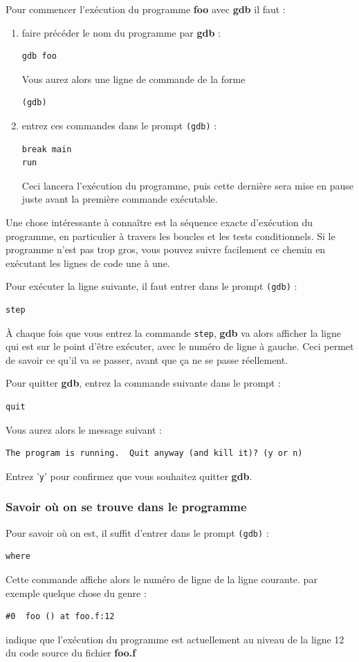 \documentclass[a4paper,twoside]{article}
\begin{document}
Pour commencer l'exécution du programme \textbf{foo} avec \textbf{gdb} il faut : 
\begin{enumerate}
\item faire précéder le nom du programme par \textbf{gdb} : 
\begin{verbatim}
gdb foo
\end{verbatim}
Vous aurez alors une ligne de commande de la forme 
\begin{verbatim}
(gdb) 
\end{verbatim}
\item entrez ces commandes dans le prompt \texttt{(gdb)} :
\begin{verbatim}
break main
run
\end{verbatim}
Ceci lancera l'exécution du programme, puis cette dernière sera mise en pause juste avant la première commande exécutable.
\end{enumerate}

\bigskip

Une chose intéressante à connaître est la séquence exacte d'exécution du programme, en particulier à travers les boucles et les tests conditionnels. Si le programme n'est pas trop gros, vous pouvez suivre facilement ce chemin en exécutant les lignes de code une à une. 

Pour exécuter la ligne suivante, il faut entrer dans le prompt \texttt{(gdb)} :
\begin{verbatim}
step
\end{verbatim}

À chaque fois que vous entrez la commande \texttt{step}, \textbf{gdb} va alors afficher la ligne qui est sur le point d'être exécuter, avec le numéro de ligne à gauche. Ceci permet de savoir ce qu'il va se passer, avant que ça ne se passe réellement.

\bigskip

Pour quitter \textbf{gdb}, entrez la commande suivante dans le prompt : 
\begin{verbatim}
quit
\end{verbatim}
Vous aurez alors le message suivant : 
\begin{verbatim}
The program is running.  Quit anyway (and kill it)? (y or n)
\end{verbatim}
Entrez '\texttt{y}' pour confirmez que vous souhaitez quitter \textbf{gdb}.

\subsubsection{Savoir où on se trouve dans le programme}
Pour savoir où on est, il suffit d'entrer dans le prompt \texttt{(gdb)} :
\begin{verbatim}
where
\end{verbatim}
Cette commande affiche alors le numéro de ligne de la ligne courante. par exemple quelque chose du genre : 
\begin{verbatim}
#0  foo () at foo.f:12
\end{verbatim}
indique que l'exécution du programme est actuellement au niveau de la ligne 12 du code source du fichier \textbf{foo.f}
\end{document}
